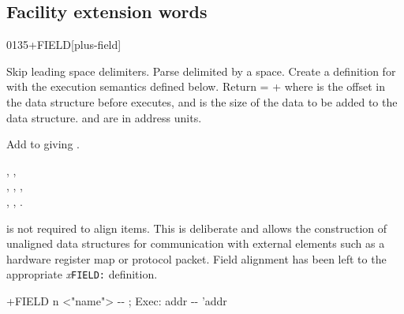 \subsection{Facility extension words} %
\extended


\begin{worddef}{0135}{+FIELD}[plus-field]%
\item {}

	Skip leading space delimiters.  Parse  delimited
	by a space.  Create a definition for  with the
	execution semantics defined below.  Return  =
	 +  where  is the offset
	in the data structure before  executes, and
	 is the size of the data to be added to the data
	structure.  and  are in address units.

\execute[name]

	Add  to  giving .

\see {},
	, \\
	,
	,
	, \\
	,
	,
	.

	\begin{rationale} %
		 is not required to align items.  This is
		deliberate and allows the construction of unaligned data
		structures for communication with external elements such
		as a hardware register map or protocol packet.
		Field alignment has been left to the appropriate
		\emph{x}\texttt{FIELD:} definition.
	\end{rationale}

	\begin{implement} %

		\word{:} +FIELD\tab{} n <"name"> -{}- ; Exec: addr -{}- 'addr \\
		\tab {}  \word{,} \word{+} \\
		\tab {}  \word{+} \\
		\word{;}
	\end{implement}
\end{worddef}


